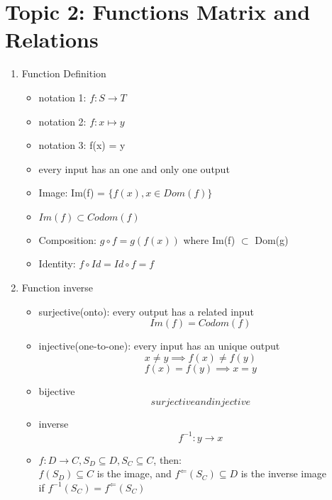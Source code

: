 \documentclass[11pt, a4paper]{article}
\begin{document}
\section*{Topic 2: Functions Matrix and Relations}
    \begin{enumerate}
        \item Function Definition
            \begin{itemize}
                \item notation 1: $f: S \rightarrow T$
                \item notation 2: $f: x \mapsto y$
                \item notation 3: f(x) = y
                \item every input has an one and only one output
                \item Image: Im(f) = $\{f(x), x \in Dom(f)\}$
                \item $Im(f) \subset Codom(f)$
                \item Composition: $g \circ f = g(f(x))$ where Im(f) $\subset$ Dom(g)
                \item Identity: $f \circ Id = Id \circ f = f$
            \end{itemize}
        \item Function inverse
            \begin{itemize}
                \item surjective(onto): every output has a related input\\
                    $$Im(f) = Codom(f)$$
                \item injective(one-to-one): every input has an unique output\\
                    $$x \ne y \implies f(x) \ne f(y)$$
                    $$f(x) = f(y) \implies x = y$$
                \item bijective\\
                    $$surjective and injective$$
                \item inverse\\
                    $$f^{-1}: y \rightarrow x$$
                \item $f: D \rightarrow C, S_D \subseteq D, S_C \subseteq C$, then:\\
                    $f(S_D) \subseteq C$ is the image, and $f^{\Leftarrow}(S_C) \subseteq D$ is the inverse image\\
                    if $f^{-1}(S_C) = f^{\Leftarrow}(S_C)$
            \end{itemize}

\end{enumerate}
\end{document}
